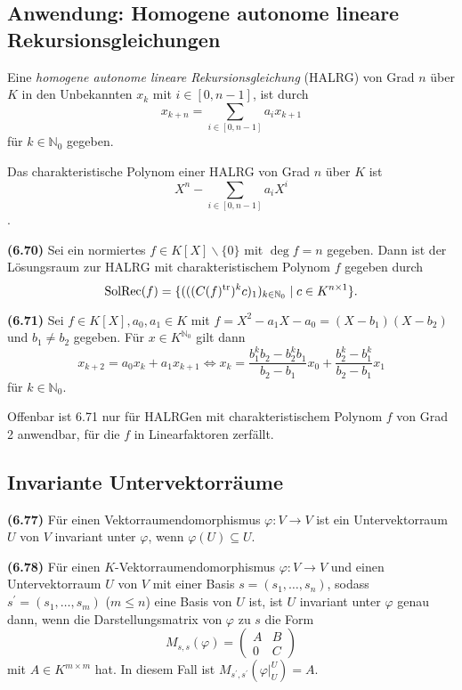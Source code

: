 \documentclass[a4paper,parskip=half*,DIV=15,fontsize=11pt]{scrartcl}
\newlength{\hangwidth}
\newcommand{\skript}[1]{\settowidth{\hangwidth}{\textbf{(#1)} }\hangpara{\hangwidth}{1}\textbf{(#1)} \ignorespaces} %
\newcommand{\SolRec}{\mathrm{SolRec}} %
\newcommand{\N}{\mathbb{N}}
\newcommand{\transpose}[1]{#1^{\mathrm{tr}}}
\DeclarePairedDelimiter\set{\{}{\}} %
\begin{document}
\subsection{Anwendung: Homogene autonome lineare Rekursionsgleichungen}

Eine \textit{homogene autonome lineare Rekursionsgleichung} (HALRG) von Grad $n$ über $K$ in den Unbekannten $x_k$ mit $i \in [0, n-1]$, ist durch $$x_{k+n} = \sum_{i \in [0,n-1]} a_ix_{k+1}$$ für $k \in \N_0$ gegeben.

Das charakteristische Polynom einer HALRG von Grad $n$ über $K$ ist $$X^n - \sum_{i \in [0, n-1]}a_i X^i$$.

\skript{6.70} Sei ein normiertes $f \in K[X]\backslash\{0\}$ mit $\deg{f} = n$ gegeben. Dann ist der Lösungsraum zur HALRG mit charakteristischem Polynom $f$ gegeben durch $$\SolRec(f) = \set{ (((\transpose{C(f)})^k c)_1)_{k\in\N_0} \;|\; c \in K^{n \times 1} }.$$

\skript{6.71} Sei $f \in K[X], a_0, a_1 \in K$ mit $f = X^2 - a_1X - a_0 = (X - b_1)(X - b_2)$ und $b_1 \neq b_2$ gegeben.  Für $x \in K^{\N_0}$ gilt dann $$x_{k+2} = a_0x_k + a_1x_{k+1} \iff x_k = \frac{b_1^kb_2 - b_2^kb_1}{b_2 - b_1}x_0 + \frac{b_2^k - b_1^k}{b_2 - b_1}x_1$$ für $k \in \N_0$.

Offenbar ist 6.71 nur für HALRGen mit charakteristischem Polynom $f$ von Grad 2 anwendbar, für die $f$ in Linearfaktoren zerfällt.

\subsection{Invariante Untervektorräume}

\skript{6.77} Für einen Vektorraumendomorphismus $\varphi: V \to V$ ist ein Untervektorraum $U$ von $V$ invariant unter $\varphi$, wenn
$\varphi(U) \subseteq U$.

\skript{6.78} Für einen $K$-Vektorraumendomorphismus $\varphi: V \to V$ und einen Untervektorraum $U$ von $V$ mit einer Basis $s = (s_1,\ldots, s_n)$, sodass $s^\prime = (s_1,\ldots,s_m)$ ($m \leq n$) eine Basis von $U$ ist, ist $U$ invariant unter $\varphi$ genau dann, wenn die Darstellungsmatrix von $\varphi$ zu $s$ die Form
$$M_{s,s}(\varphi) = \left(\begin{array}{cc}
		A & B	\\
		0 & C
	\end{array}\right)$$
mit $A \in K^{m \times m}$ hat. In diesem Fall ist $M_{s^\prime,s^\prime}(\varphi\vert_U^U) = A$.
\end{document}
